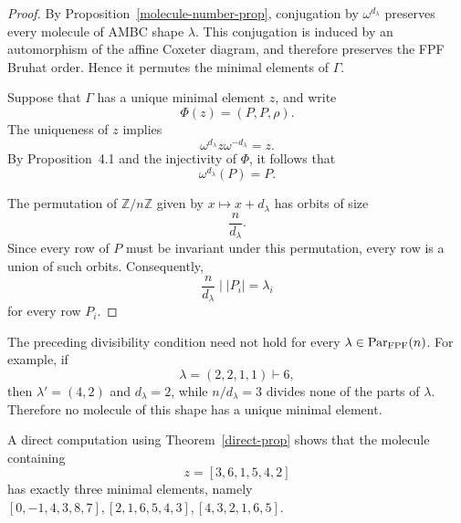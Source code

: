 \documentclass[11pt]{article}
\begin{document}
\begin{proof}
By Proposition~\ref{molecule-number-prop}, conjugation by
$\omega^{d_\lambda}$ preserves every molecule of AMBC shape
$\lambda$. This conjugation is induced by an automorphism of the
affine Coxeter diagram, and therefore preserves the FPF Bruhat
order. Hence it permutes the minimal elements of $\Gamma$.

Suppose that $\Gamma$ has a unique minimal element $z$, and
write
\[
\Phi(z)=(P,P,\rho).
\]
The uniqueness of $z$ implies
\[
\omega^{d_\lambda}z\omega^{-d_\lambda}=z.
\]
By Proposition~4.1 and the injectivity of $\Phi$, it follows
that
\[
\omega^{d_\lambda}(P)=P.
\]

The permutation of $\mathbb Z/n\mathbb Z$ given by
$x\mapsto x+d_\lambda$ has orbits of size
\[
\frac{n}{d_\lambda}.
\]
Since every row of $P$ must be invariant under this
permutation, every row is a union of such orbits. Consequently,
\[
\frac{n}{d_\lambda}\mid |P_i|=\lambda_i
\]
for every row $P_i$.
\end{proof}

\begin{remark}
The preceding divisibility condition need not hold for every $\lambda\in{\operatorname{Par}_{\mathrm{FPF}}}(n)$. For example, if
\[
\lambda=(2,2,1,1)\vdash6,
\]
then $\lambda'=(4,2)$ and $d_\lambda=2$, while
$n/d_\lambda=3$ divides none of the parts of $\lambda$.
Therefore no molecule of this shape has a unique minimal
element. 

A direct computation using Theorem~\ref{direct-prop} shows that
the molecule containing
\[
z=[3,6,1,5,4,2]
\]
has exactly three minimal elements, namely $[0,-1,4,3,8,7],[2,1,6,5,4,3],[4,3,2,1,6,5]$.
\end{remark}
\end{document}
